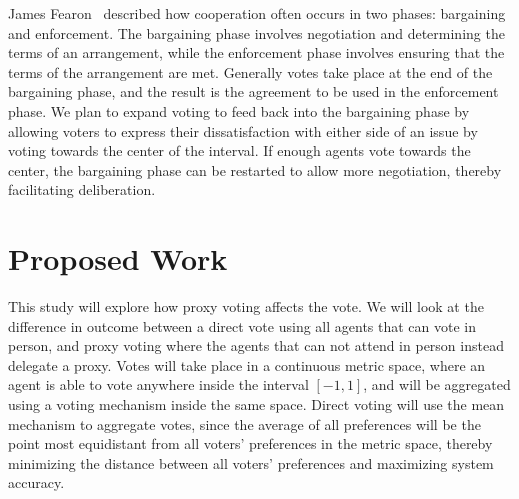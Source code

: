 James Fearon~\cite{Fearon1998} described how cooperation often occurs in two phases:
bargaining and enforcement.
The bargaining phase involves negotiation and determining the terms of an arrangement,
while the enforcement phase involves ensuring that the terms of the arrangement are met.
Generally votes take place at the end of the bargaining phase, and the result is the
agreement to be used in the enforcement phase.
We plan to expand voting to feed back into the bargaining phase by allowing voters to
express their dissatisfaction with either side of an issue by voting towards the
center of the interval.
If enough agents vote towards the center, the bargaining phase can be restarted to
allow more negotiation, thereby facilitating deliberation.


\section{Proposed Work}\label{sec:contribution}
This study will explore how proxy voting affects the vote.
We will look at the difference in outcome between a direct vote using all agents that
can vote in person, and proxy voting where the agents that can not attend in person
instead delegate a proxy.
Votes will take place in a continuous metric space, where an agent is able to vote
anywhere inside the interval $[-1, 1]$, and will be aggregated using a voting
mechanism inside the same space.
Direct voting will use the mean mechanism to aggregate votes, since the average of
all preferences will be the point most equidistant from all voters' preferences in
the metric space, thereby minimizing the distance between all voters' preferences and
maximizing system accuracy.

